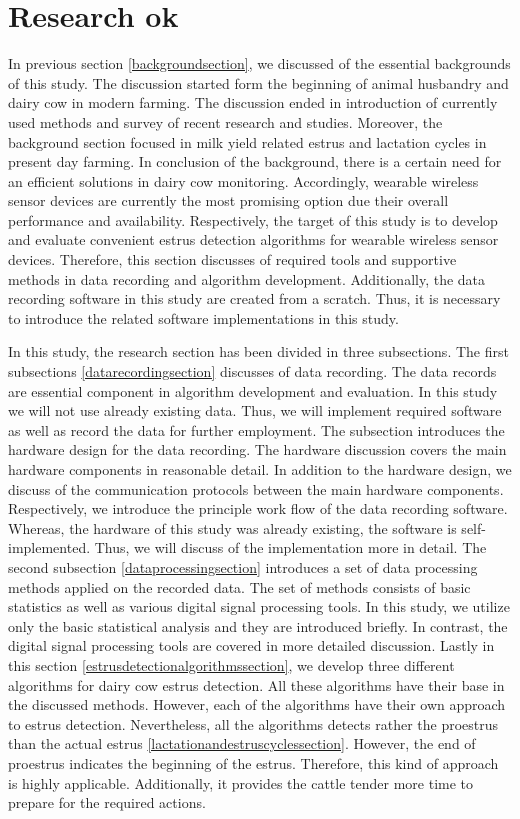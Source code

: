 \documentclass[english,12pt,a4paper,pdftex,elec,utf8]{aaltothesis}
\begin{document}
\section{Research ok} \label{researchsection}

In previous section \ref{backgroundsection}, we discussed of the essential backgrounds of this study. The discussion started form the beginning of animal husbandry and dairy cow in modern farming. The discussion ended in introduction of currently used methods and survey of recent research and studies. Moreover, the background section focused in milk yield related estrus and lactation cycles in present day farming. In conclusion of the background, there is a certain need for an efficient solutions in dairy cow monitoring. Accordingly, wearable wireless sensor devices are currently the most promising option due their overall performance and availability. Respectively, the target of this study is to develop and evaluate convenient estrus detection algorithms for wearable wireless sensor devices. Therefore, this section discusses of required tools and supportive methods in data recording and algorithm development. Additionally, the data recording software in this study are created from a scratch. Thus, it is necessary to introduce the related software implementations in this study.

In this study, the research section has been divided in three subsections. The first subsections \ref{datarecordingsection}  discusses of data recording. The data records are essential component in algorithm development and evaluation. In this study we will not use already existing data. Thus, we will implement required software as well as record the data for further employment. The subsection introduces the hardware design for the data recording. The hardware discussion covers the main hardware components in reasonable detail. In addition to the hardware design, we discuss of the communication protocols between the main hardware components. Respectively, we introduce the principle work flow of the data recording software. Whereas, the hardware of this study was already existing, the software is self-implemented. Thus, we will discuss of  the implementation more in detail. The second subsection \ref{dataprocessingsection} introduces a set of data processing methods applied on the recorded data. The set of methods consists of basic statistics as well as various digital signal processing tools. In this study, we utilize only the basic statistical analysis and they are introduced briefly. In contrast, the digital signal processing tools are covered in more detailed discussion. Lastly in this section \ref{estrusdetectionalgorithmssection}, we develop three different algorithms for dairy cow estrus detection. All these algorithms have their base in the discussed methods. However, each of the algorithms have their own approach to estrus detection. Nevertheless, all the algorithms detects rather the proestrus than the actual estrus \ref{lactationandestruscyclessection}. However, the end of proestrus indicates the beginning of the estrus. Therefore, this kind of approach is highly applicable. Additionally, it provides the cattle tender more time to prepare for the required actions. 
\end{document}
